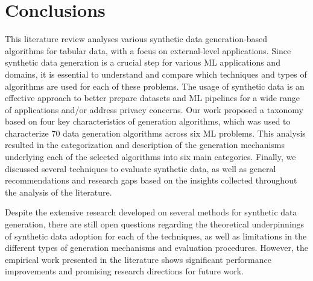 \section{Conclusions}\label{sec:conclusions}

This literature review analyses various synthetic data generation-based
algorithms for tabular data, with a focus on external-level applications.
Since synthetic data generation is a crucial step for various ML applications
and domains, it is essential to understand and compare which techniques and
types of algorithms are used for each of these problems. The usage of
synthetic data is an effective approach to better prepare datasets and ML
pipelines for a wide range of applications and/or address privacy concerns.
Our work proposed a taxonomy based on four key characteristics of generation
algorithms, which was used to characterize 70 data generation algorithms
across six ML problems. This analysis resulted in the categorization and
description of the generation mechanisms underlying each of the selected
algorithms into six main categories. Finally, we discussed several techniques
to evaluate synthetic data, as well as general recommendations and research
gaps based on the insights collected throughout the analysis of the
literature.

Despite the extensive research developed on several methods for synthetic
data generation, there are still open questions regarding the theoretical
underpinnings of synthetic data adoption for each of the techniques, as well
as limitations in the different types of generation mechanisms and evaluation
procedures. However, the empirical work presented in the literature shows
significant performance improvements and promising research directions for
future work.
